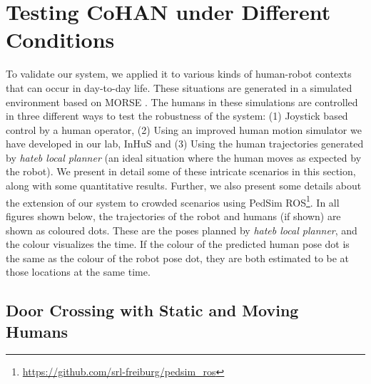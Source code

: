 \section{Testing CoHAN under Different Conditions}\label{results_chap4}
To validate our system, we applied it to various kinds of human-robot contexts that can occur in day-to-day life. These situations are generated in a simulated environment based on MORSE \cite{echeverria2011modular}. The humans in these simulations are controlled in three different ways to test the robustness of the system: (1) Joystick based control by a human operator, (2) Using an improved human motion simulator we have developed in our lab, InHuS \cite{favier2022_hri} and (3) Using the human trajectories generated by \textit{\acrshort{hateb} local planner} (an ideal situation where the human moves as expected by the robot). We present in detail some of these intricate scenarios in this section, along with some quantitative results. Further, we also present some details about the extension of our system to crowded scenarios using PedSim ROS\footnote{\url{https://github.com/srl-freiburg/pedsim_ros}}. In all figures shown below, the trajectories of the robot and humans (if shown) are shown as coloured dots. These are the poses planned by \textit{\acrshort{hateb} local planner}, and the colour visualizes the time. If the colour of the predicted human pose dot is the same as the colour of the robot pose dot, they are both estimated to be at those locations at the same time.

\subsection{Door Crossing with Static and Moving Humans}

